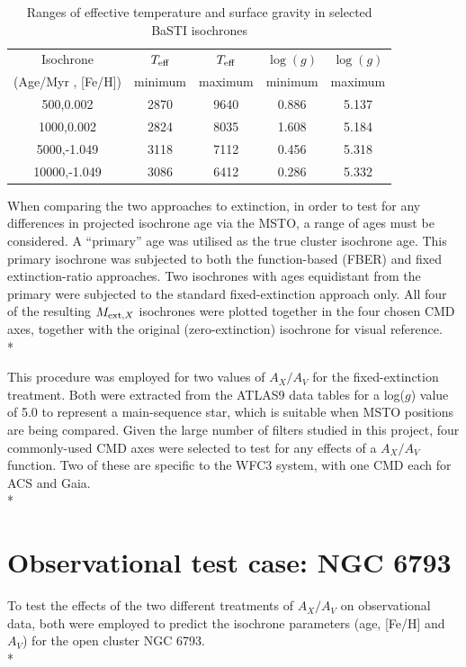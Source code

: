 \documentclass[12pt, a4paper]{report}
\begin{document}
\begin{table}
\begin{center}
\begin{tabular}{ccccc}
\hline
Isochrone & $T_{\textnormal{eff}}$ & $T_{\textnormal{eff}}$ & $\log(g)$ & $\log(g)$ \\
(Age/Myr , [Fe/H]) & minimum & maximum & minimum & maximum \\
\hline
500,0.002 & 2870 & 9640 & 0.886 & 5.137 \\
1000,0.002 & 2824 & 8035 & 1.608 & 5.184 \\
5000,-1.049 & 3118 & 7112 & 0.456 & 5.318 \\
10000,-1.049 & 3086 & 6412 & 0.286 & 5.332 \\
\hline
\end{tabular}
\caption{Ranges of effective temperature and surface gravity in selected BaSTI isochrones}
\label{variable_ranges}
\end{center}
\end{table}

When comparing the two approaches to extinction, in order to test for any differences in projected isochrone age via the MSTO, a range of ages must be considered. A ``primary'' age was utilised as the true cluster isochrone age. This primary isochrone was subjected to both the function-based (FBER) and fixed extinction-ratio approaches. Two isochrones with ages equidistant from the primary were subjected to the standard fixed-extinction approach only. All four of the resulting $M_{\textnormal{ext},X}$ isochrones were plotted together in the four chosen CMD axes, together with the original (zero-extinction) isochrone for visual reference.\\*

This procedure was employed for two values of $A_{X}/A_{V}$ for the fixed-extinction treatment. Both were extracted from the ATLAS9 data tables for a log($g$) value of 5.0 to represent a main-sequence star, which is suitable when MSTO positions are being compared. Given the large number of filters studied in this project, four commonly-used CMD axes were selected to test for any effects of a $A_{X}/A_{V}$ function. Two of these are specific to the WFC3 system, with one CMD each for ACS and Gaia.\\*

\section{Observational test case: NGC 6793} \label{obs_ngc_section}
To test the effects of the two different treatments of $A_{X}/A_{V}$ on observational data, both were employed to predict the isochrone parameters (age, [Fe/H] and $A_{V}$) for the open cluster NGC 6793.\\*
\end{document}
